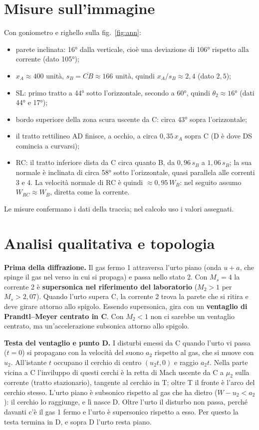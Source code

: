\documentclass[11pt,a4paper]{article}
\newcommand{\Ms}{M_{s}}
\begin{document}
\section{Misure sull'immagine}
Con goniometro e righello sulla fig.~\ref{fig:ann}:
\begin{itemize}
\item parete inclinata: \ang{16} dalla verticale, cioè una deviazione di \ang{106} rispetto alla corrente
  (dato \ang{105});
\item $x_A \approx 400$ unità, $s_B=\overline{CB}\approx 166$ unità, quindi $x_A/s_B\approx 2{,}4$ (dato $2{,}5$);
\item SL: primo tratto a \ang{44} sotto l'orizzontale, secondo a \ang{60}, quindi $\theta_2\approx\ang{16}$
  (dati \ang{44} e \ang{17});
\item bordo superiore della zona scura uscente da C: circa \ang{43} sopra l'orizzontale;
\item il tratto rettilineo AD finisce, a occhio, a circa $0{,}35\,x_A$ sopra C (D è dove DS comincia a curvarsi);
\item RC: il tratto inferiore dista da C circa quanto B, da $0{,}96\,s_B$ a $1{,}06\,s_B$; la sua normale è
  inclinata di circa \ang{58} sotto l'orizzontale, quasi parallela alle correnti 3 e 4. La velocità normale di RC è
  quindi $\approx 0{,}95\,W_B$: nel seguito assumo $W_{RC}\approx W_B$, diretta come la corrente.
\end{itemize}
Le misure confermano i dati della traccia; nel calcolo uso i valori assegnati.

\section{Analisi qualitativa e topologia}
\textbf{Prima della diffrazione.} Il gas fermo 1 attraversa l'urto piano (onda $u+a$, che spinge il gas nel verso in cui
si propaga) e passa nello stato 2. Con $\Ms=4$ la corrente 2 è \textbf{supersonica nel riferimento del
laboratorio} ($M_2>1$ per $\Ms>2{,}07$). Quando l'urto supera C, la corrente 2 trova la parete che si ritira e deve
girare attorno allo spigolo. Essendo supersonica, gira con un \textbf{ventaglio di Prandtl--Meyer centrato in C}.
Con $M_2<1$ non ci sarebbe un ventaglio centrato, ma un'accelerazione subsonica attorno allo spigolo.

\textbf{Testa del ventaglio e punto D.} I disturbi emessi da C quando l'urto vi passa ($t=0$) si propagano con la
velocità del suono $a_2$ rispetto al gas, che si muove con $u_2$. All'istante $t$ occupano il cerchio di centro
$(u_2t,0)$ e raggio $a_2t$. Nella parte vicina a C l'inviluppo di questi cerchi è la retta di Mach uscente da C a
$\mu_2$ sulla corrente (tratto stazionario), tangente al cerchio in T; oltre T il fronte è l'arco del cerchio stesso.
L'urto piano è subsonico rispetto al gas che ha dietro ($W-u_2<a_2$): il cerchio lo raggiunge, e lì nasce D. Oltre
l'urto il disturbo non passa, perché davanti c'è il gas 1 fermo e l'urto è supersonico rispetto a esso. Per questo
la testa termina in D, e sopra D l'urto resta piano.
\end{document}
